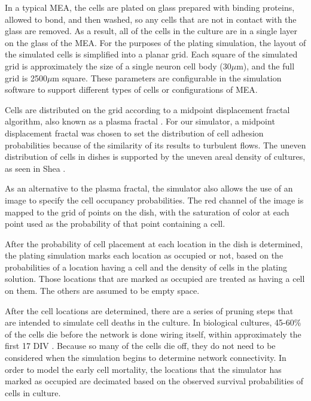 \documentclass[letterpaper]{article}
\begin{document}
In a typical MEA, the cells are plated on glass prepared with binding proteins, allowed to bond, and then washed, so any cells that are not in contact with the glass are removed.
As a result, all of the cells in the culture are in a single layer on the glass of the MEA.
For the purposes of the plating simulation, the layout of the simulated cells is simplified into a planar grid. 
Each square of the simulated grid is approximately the size of a single neuron cell body (30$\mu$m), and the full grid is 2500$\mu$m square.
These parameters are configurable in the simulation software to support different types of cells or configurations of MEA.

Cells are distributed on the grid according to a midpoint displacement fractal algorithm, also known as a plasma fractal \cite{Fournier1982Stochastic}. 
For our simulator, a midpoint displacement fractal was chosen to set the distribution of cell adhesion probabilities because of the similarity of its results to turbulent flows. 
The uneven distribution of cells in dishes is supported by the uneven areal density of cultures, as seen in Shea \citeyear{shea2009optimization}. 

As an alternative to the plasma fractal, the simulator also allows the use of an image to specify the cell occupancy probabilities. 
The red channel of the image is mapped to the grid of points on the dish, with the saturation of color at each point used as the probability of that point containing a cell. 

After the probability of cell placement at each location in the dish is determined, the plating simulation marks each location as occupied or not, based on the probabilities of a location having a cell and the density of cells in the plating solution. 
Those locations that are marked as occupied are treated as having a cell on them. The others are assumed to be empty space. 

After the cell locations are determined, there are a series of pruning steps that are intended to simulate cell deaths in the culture. 
In biological cultures, 45-60\% of the cells die before the network is done wiring itself, within approximately the first 17 DIV \cite{erickson2008caged}.
Because so many of the cells die off, they do not need to be considered when the simulation begins to determine network connectivity. 
In order to model the early cell mortality, the locations that the simulator has marked as occupied are decimated based on the observed survival probabilities of cells in culture. 
\end{document}
